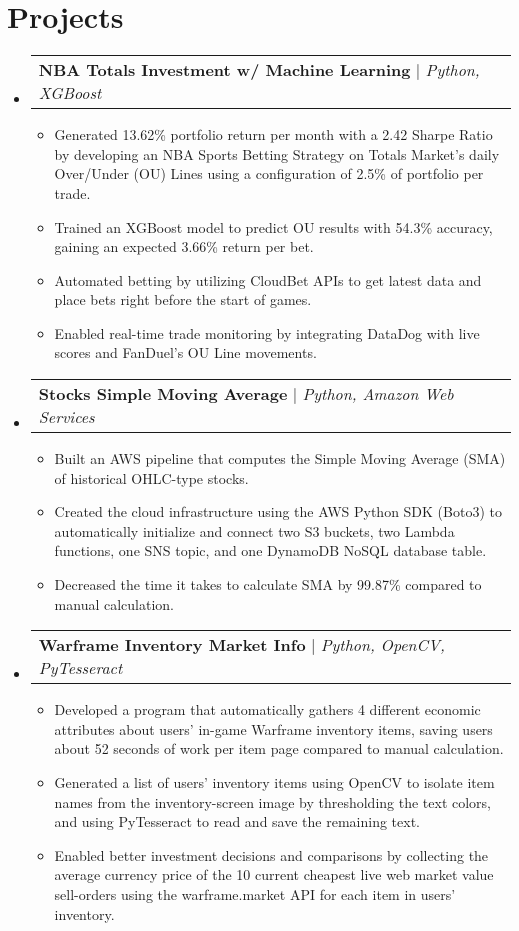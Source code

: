 \documentclass[letterpaper,11pt]{article}
\makeatletter
\newcommand{\resumeItem}[1]{
  \item\small{
    {#1 \vspace{-2pt}}
  }
}
\newcommand{\resumeProjectHeading}[2]{
    \item
    \begin{tabular*}{0.97\textwidth}{l@{\extracolsep{\fill}}r}
      \small#1 & #2 \\
    \end{tabular*}\vspace{-7pt}
}
\newcommand{\resumeSubHeadingListStart}{\begin{itemize}[leftmargin=0.15in, label={}]}
\newcommand{\resumeSubHeadingListEnd}{\end{itemize}}
\newcommand{\resumeItemListStart}{\begin{itemize}}
\newcommand{\resumeItemListEnd}{\end{itemize}\vspace{-5pt}}
\makeatother
\begin{document}
\section{Projects}
    \resumeSubHeadingListStart
      \resumeProjectHeading
          {\textbf{NBA Totals Investment w/ Machine Learning} $|$ \emph{Python, XGBoost}}{}
          \resumeItemListStart
            \resumeItem{Generated 13.62\% portfolio return per month with a 2.42 Sharpe Ratio by developing an NBA Sports Betting Strategy on Totals Market's daily Over/Under (OU) Lines using a configuration of 2.5\% of portfolio per trade.}
            \resumeItem{Trained an XGBoost model to predict OU results with 54.3\% accuracy, gaining an expected 3.66\% return per bet.}
            \resumeItem{Automated betting by utilizing CloudBet APIs to get latest data and place bets right before the start of games.}
            \resumeItem{Enabled real-time trade monitoring by integrating DataDog with live scores and FanDuel's OU Line movements.}
          \resumeItemListEnd
      \resumeProjectHeading
          {\textbf{Stocks Simple Moving Average} $|$ \emph{Python, Amazon Web Services}}{}
          \resumeItemListStart
            \resumeItem{Built an AWS pipeline that computes the Simple Moving Average (SMA) of historical OHLC-type stocks.}
            \resumeItem{Created the cloud infrastructure using the AWS Python SDK (Boto3) to automatically initialize and connect two S3 buckets, two Lambda functions, one SNS topic, and one DynamoDB NoSQL database table.}
            \resumeItem{Decreased the time it takes to calculate SMA by 99.87\% compared to manual calculation.}
          \resumeItemListEnd
      \resumeProjectHeading
          {\textbf{Warframe Inventory Market Info} $|$ \emph{Python, OpenCV, PyTesseract}}{}
          \resumeItemListStart
            \resumeItem{Developed a program that automatically gathers 4 different economic attributes about users’ in-game Warframe inventory items, saving users about 52 seconds of work per item page compared to manual calculation.}
            \resumeItem{Generated a list of users' inventory items using OpenCV to isolate item names from the inventory-screen image by thresholding the text colors, and using PyTesseract to read and save the remaining text.}
            \resumeItem{Enabled better investment decisions and comparisons by collecting the average currency price of the 10 current cheapest live web market value sell-orders using the warframe.market API for each item in users' inventory.}
          \resumeItemListEnd
    \resumeSubHeadingListEnd


\end{document}
